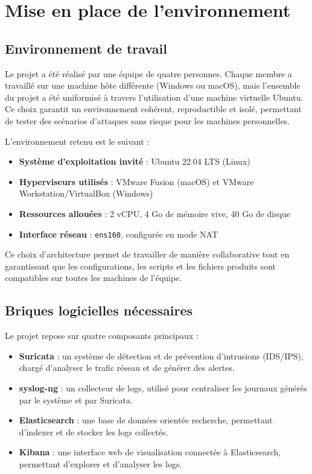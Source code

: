 \chapter{Mise en place de l’environnement}
\label{chap:chap_1}


\section{Environnement de travail}
Le projet a été réalisé par une équipe de quatre personnes. Chaque membre a travaillé sur une machine hôte différente (Windows ou macOS), mais l’ensemble du projet a été uniformisé à travers l’utilisation d’une machine virtuelle Ubuntu. Ce choix garantit un environnement cohérent, reproductible et isolé, permettant de tester des scénarios d’attaques sans risque pour les machines personnelles.

L’environnement retenu est le suivant :
\begin{itemize}
    \item \textbf{Système d’exploitation invité} : Ubuntu 22.04 LTS (Linux)
    \item \textbf{Hyperviseurs utilisés} : VMware Fusion (macOS) et VMware Workstation/VirtualBox (Windows)
    \item \textbf{Ressources allouées} : 2 vCPU, 4 Go de mémoire vive, 40 Go de disque
    \item \textbf{Interface réseau} : \texttt{ens160}, configurée en mode NAT
\end{itemize}

Ce choix d’architecture permet de travailler de manière collaborative tout en garantissant que les configurations, les scripts et les fichiers produits sont compatibles sur toutes les machines de l’équipe.

\section{Briques logicielles nécessaires}
Le projet repose sur quatre composants principaux :
\begin{itemize}
    \item \textbf{Suricata} : un système de détection et de prévention d’intrusions (IDS/IPS), chargé d’analyser le trafic réseau et de générer des alertes.
    \item \textbf{syslog-ng} : un collecteur de logs, utilisé pour centraliser les journaux générés par le système et par Suricata.
    \item \textbf{Elasticsearch} : une base de données orientée recherche, permettant d’indexer et de stocker les logs collectés.
    \item \textbf{Kibana} : une interface web de visualisation connectée à Elasticsearch, permettant d’explorer et d’analyser les logs.
\end{itemize}

